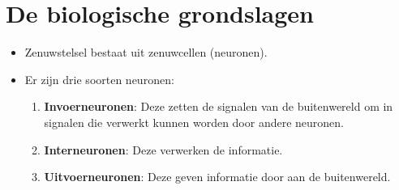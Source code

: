 \section{De biologische grondslagen}
\begin{itemize}
	\item Zenuwstelsel bestaat uit zenuwcellen (neuronen).
	\item Er zijn drie soorten neuronen:
	\begin{enumerate}
		\item \textbf{Invoerneuronen}: Deze zetten de signalen van de buitenwereld om in signalen die verwerkt kunnen worden door andere neuronen.
		\item \textbf{Interneuronen}: Deze verwerken de informatie.
		\item \textbf{Uitvoerneuronen}: Deze geven informatie door aan de buitenwereld.
	\end{enumerate}

\end{itemize}